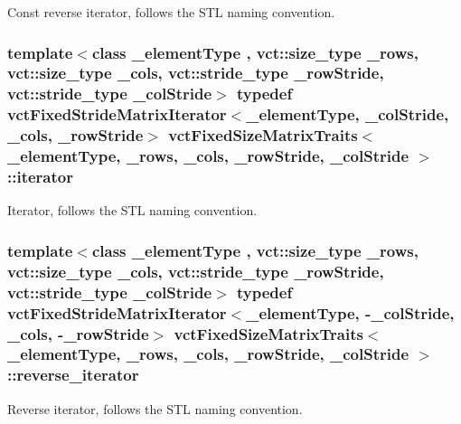 Const reverse iterator, follows the S\-T\-L naming convention. \hypertarget{classvct_fixed_size_matrix_traits_a677065481ada218e2559cdec92e97fd8}{
\subsubsection[{iterator}]{\setlength{\rightskip}{0pt plus 5cm}template$<$class \-\_\-element\-Type , vct\-::size\-\_\-type \-\_\-rows, vct\-::size\-\_\-type \-\_\-cols, vct\-::stride\-\_\-type \-\_\-row\-Stride, vct\-::stride\-\_\-type \-\_\-col\-Stride$>$ typedef {\bf vct\-Fixed\-Stride\-Matrix\-Iterator}$<$\-\_\-element\-Type, \-\_\-col\-Stride, \-\_\-cols, \-\_\-row\-Stride$>$ {\bf vct\-Fixed\-Size\-Matrix\-Traits}$<$ \-\_\-element\-Type, \-\_\-rows, \-\_\-cols, \-\_\-row\-Stride, \-\_\-col\-Stride $>$\-::{\bf iterator}}}\label{classvct_fixed_size_matrix_traits_a677065481ada218e2559cdec92e97fd8}
Iterator, follows the S\-T\-L naming convention. \hypertarget{classvct_fixed_size_matrix_traits_aa132098455575ae9bc4962c994273baa}{
\subsubsection[{reverse\-\_\-iterator}]{\setlength{\rightskip}{0pt plus 5cm}template$<$class \-\_\-element\-Type , vct\-::size\-\_\-type \-\_\-rows, vct\-::size\-\_\-type \-\_\-cols, vct\-::stride\-\_\-type \-\_\-row\-Stride, vct\-::stride\-\_\-type \-\_\-col\-Stride$>$ typedef {\bf vct\-Fixed\-Stride\-Matrix\-Iterator}$<$\-\_\-element\-Type, -\/\-\_\-col\-Stride, \-\_\-cols, -\/\-\_\-row\-Stride$>$ {\bf vct\-Fixed\-Size\-Matrix\-Traits}$<$ \-\_\-element\-Type, \-\_\-rows, \-\_\-cols, \-\_\-row\-Stride, \-\_\-col\-Stride $>$\-::{\bf reverse\-\_\-iterator}}}\label{classvct_fixed_size_matrix_traits_aa132098455575ae9bc4962c994273baa}
Reverse iterator, follows the S\-T\-L naming convention. 

